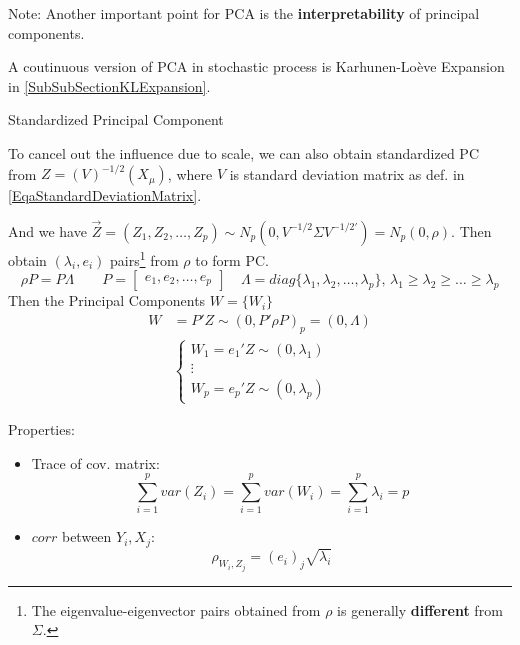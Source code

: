     

    Note: Another important point for PCA is the \textbf{interpretability} of principal components.

    A coutinuous version of PCA in stochastic process is Karhunen-Loève Expansion in \autoref{SubSubSectionKLExpansion}.

    \begin{point}
        Standardized Principal Component
    \end{point}

    To cancel out the influence due to scale, we can also obtain standardized PC from $ Z=(V)^{-1/2}(X_\mu) $, where $ V $ is standard deviation matrix as def. in \autoref{EqaStandardDeviationMatrix}.

    And we have $ \vec{Z}=(Z_{1},Z_{2},\ldots,Z_{p}) \sim N_p(0,V^{-1/2}\Sigma V^{-1/2\prime})=N_p(0,\rho ) $. Then obtain $ (\lambda _i,e_i) $ pairs\footnote{The eigenvalue-eigenvector pairs obtained from $ \rho  $ is generally \textbf{different}  from $ \Sigma  $.} from $ \rho  $ to form PC.
    \begin{equation}
        \rho  P=P\Lambda \qquad P=\begin{bmatrix}
            e_1,e_2,\ldots,e_p
        \end{bmatrix} 
        \quad \Lambda =diag\{\lambda _1,\lambda _2,\ldots,\lambda _p\},\, \lambda _1\geq\lambda _2\geq\ldots\geq\lambda _p
    \end{equation}
    Then the Principal Components $ W=\{W_i\} $ 
    \begin{align}
        W&=P'Z\sim (0,P'\rho  P)_p=(0,\Lambda  )\\
        &\begin{cases}
            W_1=e_1'Z\sim (0,\lambda _1)\\
            \vdots\\
            W_p=e_p'Z\sim (0,\lambda _p)
        \end{cases}
    \end{align}

    Properties:
    \begin{itemize}[topsep=2pt,itemsep=2pt]
        \item Trace of cov. matrix:
        \begin{equation}
            \sum_{i=1}^pvar(Z_i)=\sum_{i=1}^pvar(W_i)=\sum_{i=1}^p\lambda_i=p
        \end{equation}
        \item $ corr $ between $ Y_i,X_j $:
        \begin{equation}
            \rho_{W_i,Z_j}=(e_{i})_j\sqrt{\lambda _i}
        \end{equation}     
    \end{itemize}
    


